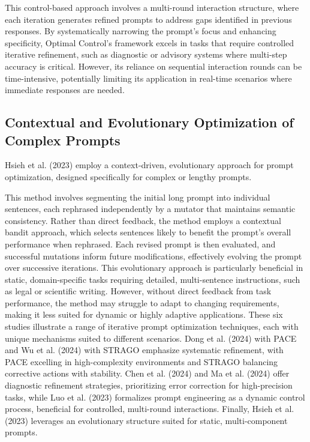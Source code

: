 \documentclass[runningheads]{llncs}
\begin{document}
This control-based approach involves a multi-round interaction structure, where each iteration generates refined prompts to address gaps identified in previous responses. By systematically narrowing the prompt’s focus and enhancing specificity, Optimal Control’s framework excels in tasks that require controlled iterative refinement, such as diagnostic or advisory systems where multi-step accuracy is critical. However, its reliance on sequential interaction rounds can be time-intensive, potentially limiting its application in real-time scenarios where immediate responses are needed.

\subsection{Contextual and Evolutionary Optimization of Complex Prompts}
Hsieh et al. (2023) \cite{hsieh2023automaticengineeringlongprompts} employ a context-driven, evolutionary approach for prompt optimization, designed specifically for complex or lengthy prompts.

This method involves segmenting the initial long prompt into individual sentences, each rephrased independently by a mutator that maintains semantic consistency. Rather than direct feedback, the method employs a contextual bandit approach, which selects sentences likely to benefit the prompt’s overall performance when rephrased. Each revised prompt is then evaluated, and successful mutations inform future modifications, effectively evolving the prompt over successive iterations. This evolutionary approach is particularly beneficial in static, domain-specific tasks requiring detailed, multi-sentence instructions, such as legal or scientific writing. However, without direct feedback from task performance, the method may struggle to adapt to changing requirements, making it less suited for dynamic or highly adaptive applications.
\newline
\newline
These six studies illustrate a range of iterative prompt optimization techniques, each with unique mechanisms suited to different scenarios. Dong et al. (2024) \cite{dong2024paceimprovingpromptactorcritic} with PACE and Wu et al. (2024) \cite{wu2024stragoharnessingstrategicguidance} with STRAGO emphasize systematic refinement, with PACE excelling in high-complexity environments and STRAGO balancing corrective actions with stability. Chen et al. (2024) \cite{chen2024repromptplanningautomaticprompt} and Ma et al. (2024) \cite{ma2024largelanguagemodelsgood} offer diagnostic refinement strategies, prioritizing error correction for high-precision tasks, while Luo et al. (2023) \cite{luo2023promptengineeringlensoptimal} formalizes prompt engineering as a dynamic control process, beneficial for controlled, multi-round interactions. Finally, Hsieh et al. (2023) \cite{hsieh2023automaticengineeringlongprompts} leverages an evolutionary structure suited for static, multi-component prompts.
\end{document}
